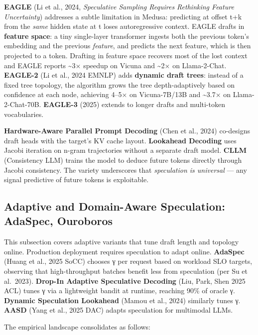 \textbf{EAGLE} (Li et al., 2024, \emph{Speculative Sampling Requires Rethinking Feature Uncertainty}) addresses a subtle limitation in Medusa: predicting at offset t+k from the \emph{same} hidden state at t loses autoregressive context. EAGLE drafts in \textbf{feature space}: a tiny single-layer transformer ingests both the previous token's embedding and the previous \emph{feature}, and predicts the next feature, which is then projected to a token. Drafting in feature space recovers most of the lost context and EAGLE reports \textasciitilde3× speedup on Vicuna and \textasciitilde2× on Llama-2-Chat. \textbf{EAGLE-2} (Li et al., 2024 EMNLP) adds \textbf{dynamic draft trees}: instead of a fixed tree topology, the algorithm grows the tree depth-adaptively based on confidence at each node, achieving 4--5× on Vicuna-7B/13B and \textasciitilde3.7× on Llama-2-Chat-70B. \textbf{EAGLE-3} (2025) extends to longer drafts and multi-token vocabularies.

\textbf{Hardware-Aware Parallel Prompt Decoding} (Chen et al., 2024) co-designs draft heads with the target's KV cache layout. \textbf{Lookahead Decoding} uses Jacobi iteration on n-gram trajectories without a separate draft model. \textbf{CLLM} (Consistency LLM) trains the model to deduce future tokens directly through Jacobi consistency. The variety underscores that \emph{speculation is universal} --- any signal predictive of future tokens is exploitable.

\subsection{Adaptive and Domain-Aware Speculation: AdaSpec, Ouroboros}\label{adaptive-and-domain-aware-speculation-adaspec-ouroboros}

This subsection covers adaptive variants that tune draft length and topology online. Production deployment requires speculation to adapt online. \textbf{AdaSpec} (Huang et al., 2025 SoCC) chooses γ per request based on workload SLO targets, observing that high-throughput batches benefit less from speculation (per Su et al.~2023). \textbf{Drop-In Adaptive Speculative Decoding} (Liu, Park, Shen 2025 ACL) tunes γ via a lightweight bandit at runtime, reaching 90\% of oracle γ. \textbf{Dynamic Speculation Lookahead} (Mamou et al., 2024) similarly tunes γ. \textbf{AASD} (Yang et al., 2025 DAC) adapts speculation for multimodal LLMs.

The empirical landscape consolidates as follows:


